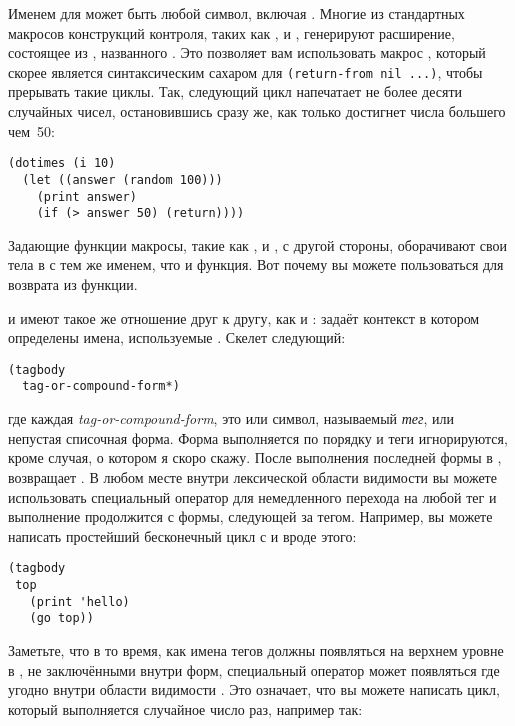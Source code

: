 Именем для  может быть любой символ, включая . Многие из стандартных
макросов конструкций контроля, таких как ,  и ,
генерируют расширение, состоящее из , названного . Это позволяет вам
использовать макрос , который скорее является синтаксическим сахаром для
\lstinline!(return-from nil ...)!, чтобы прерывать такие циклы. Так, следующий цикл
напечатает не более десяти случайных чисел, остановившись сразу же, как только достигнет
числа большего чем~50:

\begin{lstlisting}
(dotimes (i 10)
  (let ((answer (random 100)))
    (print answer)
    (if (> answer 50) (return))))
\end{lstlisting}

Задающие функции макросы, такие как ,  и , с другой
стороны, оборачивают свои тела в  с тем же именем, что и функция. Вот почему
вы можете пользоваться  для возврата из функции.

 и  имеют такое же отношение друг к другу, как  и
:  задаёт контекст в котором определены имена,
используемые . Скелет  следующий:

\begin{lstlisting}
(tagbody
  tag-or-compound-form*)
\end{lstlisting}

\noindent{}где каждая \textit{tag-or-compound-form}, это или символ, называемый \textit{тег}, или
непустая списочная форма. Форма выполняется по порядку и теги игнорируются, кроме случая,
о котором я скоро скажу. После выполнения последней формы в , 
возвращает . В любом месте внутри лексической области видимости 
вы можете использовать специальный оператор  для немедленного перехода на любой
тег и выполнение продолжится с формы, следующей за тегом. Например, вы можете написать
простейший бесконечный цикл с  и  вроде этого:

\begin{lstlisting}
(tagbody
 top
   (print 'hello)
   (go top))
\end{lstlisting}

Заметьте, что в то время, как имена тегов должны появляться на верхнем уровне в
, не заключёнными внутри форм, специальный оператор  может
появляться где угодно внутри области видимости . Это означает, что вы можете
написать цикл, который выполняется случайное число раз, например так:

